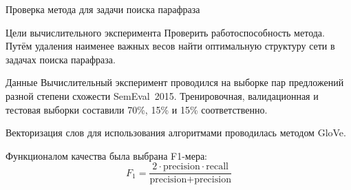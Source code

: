 \documentclass{beamer}
\begin{document}
\begin{frame}{Проверка метода для задачи поиска парафраза}

\begin{block}{Цели вычислительного эксперимента}
Проверить работоспособность метода. Путём удаления наименее важных весов найти оптимальную структуру сети в задачах поиска парафраза.
\end{block}

\begin{block}{Данные}
Вычислительный эксперимент проводился на выборке пар предложений разной степени схожести SemEval~2015. Тренировочная, валидационная и тестовая выборки составили 70\%, 15\% и 15\% соответственно.
\end{block}

Векторизация слов для использования алгоритмами проводилась методом GloVe.

Функционалом качества была выбрана F1-мера:
$$F_1 = \frac{2 \cdot \text{precision} \cdot \text{recall}}{\text{precision} + \text{precision}}$$

\end{frame}



%
%
%
%
\end{document}
